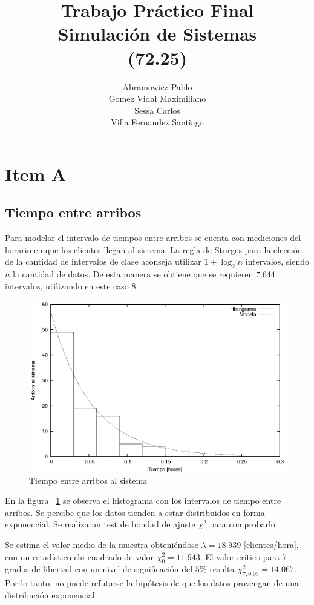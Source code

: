 \documentclass[a4paper,10pt]{article}
\title{Trabajo Pr\'actico Final\\ Simulaci\'on de Sistemas\\ (72.25)}
\author{
Abramowicz Pablo\\
Gomez Vidal Maximiliano\\
Sessa Carlos\\
Villa Fernandez Santiago\\
}
\begin{document}
\maketitle

\section*{Item A}

\subsection*{Tiempo entre arribos}


Para modelar el intervalo de tiempos entre arribos se cuenta con mediciones del
horario en que los clientes llegan al sistema. La regla de
Sturges para la elecci\'on de la cantidad de intervalos de clase 
aconseja utilizar $1 + \log_2 n$ intervalos, siendo $n$
la cantidad de datos. De esta manera se obtiene que se requieren $7.644$ intervalos,
utilizando en este caso $8$. 

\begin{figure}[hp]
\centering
\includegraphics{graficos/histograma_llegadas.eps}
\caption{Tiempo entre arribos al sistema}
\label{fig:tiempoentrearribos}
\end{figure}


En la figura ~\ref{fig:tiempoentrearribos} se observa el histograma con los
intervalos de tiempo entre arribos. Se percibe que los datos tienden a estar
distribuidos en forma exponencial. Se realiza un test de bondad de ajuste
$\chi^2$ para comprobarlo.


Se estima el valor medio de la muestra obteni\'endose 
$\lambda = 18.939$ [clientes/hora],
con un estad\'istico chi-cuadrado de valor $\chi_0^2 = 11.943$. 
El valor cr\'itico para $7$ grados de libertad con un nivel
de significaci\'on del $5\%$ resulta $\chi_{7,0.05}^2 = 14.067$. Por lo tanto,
no puede refutarse la hip\'otesis de que los datos provengan de una distribuci\'on 
exponencial.
\end{document}
